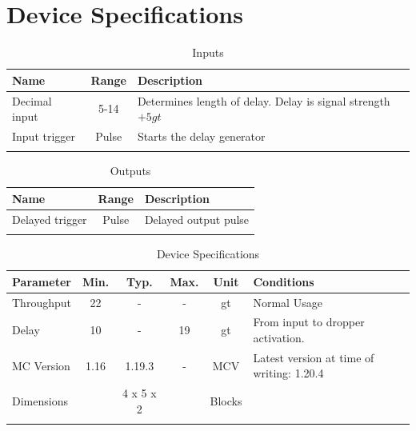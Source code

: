 \documentclass[10pt]{datasheet}
\begin{document}
\onecolumn

\section{Device Specifications}

\begin{table}[h]
    \caption{Inputs}
    \begin{tabularx}{\textwidth}{l | c | X}
        \thickhline
        \textbf{Name} & \textbf{Range} & \textbf{Description} \\
        \hline
        Decimal input & 5-14 & Determines length of delay. Delay is signal strength $+ 5gt$ \\
        \hline
        Input trigger & Pulse & Starts the delay generator \\
        \thickhline
\end{tabularx}
\end{table}

\begin{table}[h]
    \caption{Outputs}
    \begin{tabularx}{\textwidth}{l | c | X}
        \thickhline
        \textbf{Name} & \textbf{Range} & \textbf{Description} \\
        \hline
        Delayed trigger & Pulse & Delayed output pulse \\
        \thickhline
\end{tabularx}
\end{table}

\begin{table}[h]
    \caption{Device Specifications}
    \begin{tabularx}{\textwidth}{l | c c c | c | X}
        \thickhline
        \textbf{Parameter} & \textbf{Min.} & \textbf{Typ.} & \textbf{Max.} &
        \textbf{Unit} & \textbf{Conditions} \\
        \hline
        Throughput  & 22 & - & - & gt & Normal Usage \\
        \hline
        Delay    & 10 & - & 19 & gt & From input to dropper activation. \\
        \hline
        MC Version & 1.16 & 1.19.3 & - & MCV & Latest version at time of writing: 1.20.4\\
        \hline
        Dimensions & & 4 x 5 x 2 & & Blocks & \\
        \thickhline
\end{tabularx}
\end{table}
\newpage
\end{document}
